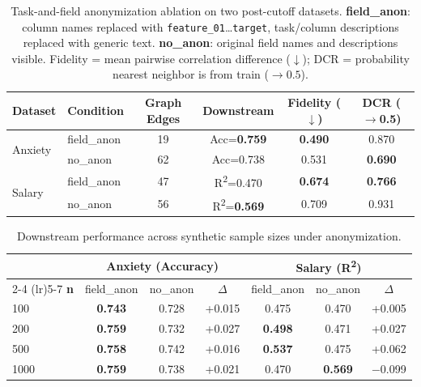 
\begin{table}[h]
\centering
\small
\caption{Task-and-field anonymization ablation on two post-cutoff datasets.
\textbf{field\_anon}: column names replaced with \texttt{feature\_01}\dots\texttt{target},
task/column descriptions replaced with generic text.
\textbf{no\_anon}: original field names and descriptions visible.
Fidelity = mean pairwise correlation difference ($\downarrow$);
DCR = probability nearest neighbor is from train ($\rightarrow 0.5$).}
\label{tab:anon-ablation}
\begin{tabular}{llcccc}
\toprule
\textbf{Dataset} & \textbf{Condition} & \textbf{Graph Edges} & \textbf{Downstream} & \textbf{Fidelity} ($\downarrow$) & \textbf{DCR} ($\rightarrow$0.5) \\
\midrule
\multirow{2}{*}{Anxiety}
  & field\_anon & 19  & Acc=\textbf{0.759} & \textbf{0.490} & 0.870 \\
  & no\_anon    & 62  & Acc=0.738          & 0.531          & \textbf{0.690} \\
\midrule
\multirow{2}{*}{Salary}
  & field\_anon & 47  & R\textsuperscript{2}=0.470          & \textbf{0.674} & \textbf{0.766} \\
  & no\_anon    & 56  & R\textsuperscript{2}=\textbf{0.569} & 0.709          & 0.931 \\
\bottomrule
\end{tabular}
\end{table}

\begin{table}[h]
\centering
\small
\caption{Downstream performance across synthetic sample sizes under anonymization.}
\label{tab:anon-downstream-n}
\begin{tabular}{lcccccc}
\toprule
& \multicolumn{3}{c}{\textbf{Anxiety} (Accuracy)} & \multicolumn{3}{c}{\textbf{Salary} (R\textsuperscript{2})} \\
\cmidrule(lr){2-4} \cmidrule(lr){5-7}
\textbf{n} & field\_anon & no\_anon & $\Delta$ & field\_anon & no\_anon & $\Delta$ \\
\midrule
100  & \textbf{0.743} & 0.728 & +0.015 & 0.475 & 0.470 & +0.005 \\
200  & \textbf{0.759} & 0.732 & +0.027 & \textbf{0.498} & 0.471 & +0.027 \\
500  & \textbf{0.758} & 0.742 & +0.016 & \textbf{0.537} & 0.475 & +0.062 \\
1000 & \textbf{0.759} & 0.738 & +0.021 & 0.470 & \textbf{0.569} & $-$0.099 \\
\bottomrule
\end{tabular}
\end{table}
